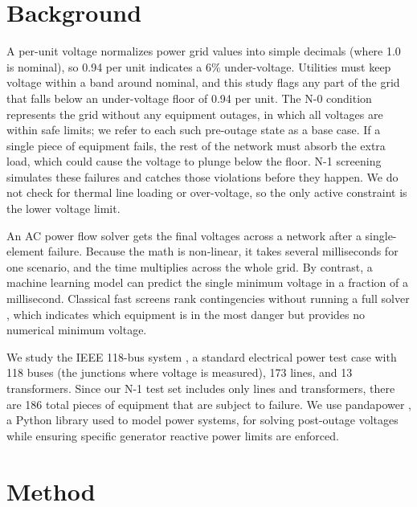 \documentclass[conference]{IEEEtran}
\begin{document}
\section{Background}
A per-unit voltage normalizes power grid values into simple decimals (where 1.0 is nominal), so 0.94 per unit indicates a 6\% under-voltage. Utilities must keep voltage within a band around nominal, and this study flags any part of the grid that falls below an under-voltage floor of 0.94 per unit. The N-0 condition represents the grid without any equipment outages, in which all voltages are within safe limits; we refer to each such pre-outage state as a base case. If a single piece of equipment fails, the rest of the network must absorb the extra load, which could cause the voltage to plunge below the floor. N-1 screening simulates these failures and catches those violations before they happen. We do not check for thermal line loading or over-voltage, so the only active constraint is the lower voltage limit.

An AC power flow solver gets the final voltages across a network after a single-element failure. Because the math is non-linear, it takes several milliseconds for one scenario, and the time multiplies across the whole grid. By contrast, a machine learning model can predict the single minimum voltage in a fraction of a millisecond. Classical fast screens rank contingencies without running a full solver \cite{ejebe1979}, which indicates which equipment is in the most danger but provides no numerical minimum voltage.

We study the IEEE 118-bus system \cite{case118}, a standard electrical power test case with 118 buses (the junctions where voltage is measured), 173 lines, and 13 transformers. Since our N-1 test set includes only lines and transformers, there are 186 total pieces of equipment that are subject to failure. We use pandapower \cite{pandapower}, a Python library used to model power systems, for solving post-outage voltages while ensuring specific generator reactive power limits are enforced.

\section{Method}
\end{document}
